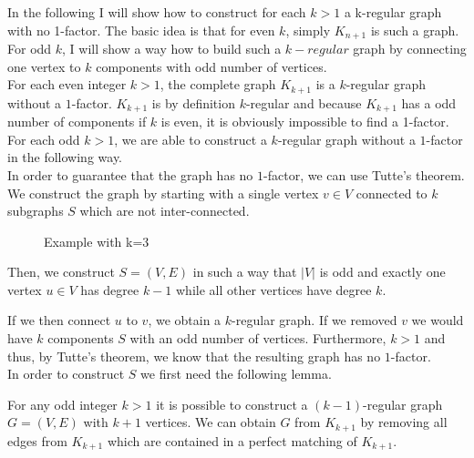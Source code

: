 \documentclass[a4paper]{article}
\begin{document}
	\newpage
	\begin{solution}{11}
		In the following I will show how to construct for each $k>1$ a k-regular graph with no 1-factor. 
		The basic idea is that for even $k$, simply $K_{n+1}$ is such a graph. 
		For odd $k$,  I will show a way how to build such a $k-regular$ graph by connecting one vertex to $k$ components with odd number of vertices.  \\ 
		
		
		For each even integer $k > 1$, the complete graph $K_{k+1}$ is a $k$-regular graph without a $1$-factor. 
		$K_{k+1}$ is by definition $k$-regular and because $K_{k+1}$ has a odd number of components if $k$ is even, it is obviously impossible to find a 1-factor. 
		For each odd $k > 1$, we are able to construct a $k$-regular graph without a $1$-factor in the following way. \\
		
		In order to guarantee that the graph has no $1$-factor, we can use Tutte's theorem. We construct the graph by starting with a single vertex $v \in V$ connected to $k$ subgraphs $S$ which are not inter-connected. 
		\begin{figure}[h]
			\centering
		\caption{Example with k=3}
		\end{figure}
		Then, we construct $S=(V,E)$ in such a way that $|V|$ is odd and exactly one vertex $u \in V$ has degree $k-1$ while all other vertices have degree $k$.
 
		If we then connect $u$ to $v$, we obtain a $k$-regular graph. If we removed $v$ we would have $k$ components $S$ with an odd number of vertices. Furthermore, $k > 1$ and thus, by Tutte's theorem, we know that the resulting graph has no $1$-factor.\\
		
		In order to construct $S$ we first need the following lemma.
		\begin{lemma}{For any odd integer $k > 1$ it is possible to construct a $(k-1)$-regular graph $G=(V,E)$ with $k+1$ vertices.}
			We can obtain $G$ from $K_{k+1}$ by removing all edges from $K_{k+1}$ which are contained in a perfect matching of $K_{k+1}$. 


\end{lemma}
\end{solution}
\end{document}
